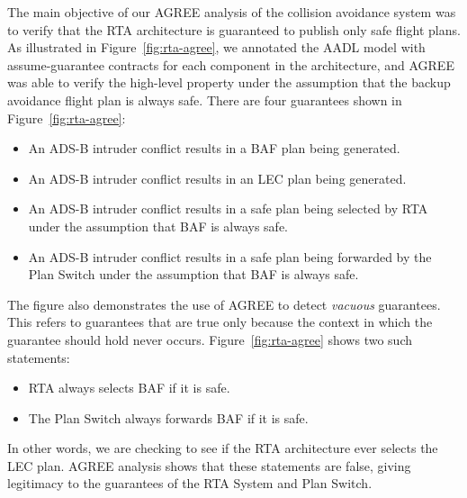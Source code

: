 
The main objective of our AGREE analysis of the collision avoidance system was to verify that the RTA architecture is guaranteed to publish only safe flight plans.
%
As illustrated in Figure~\ref{fig:rta-agree}, we annotated the AADL model with assume-guarantee contracts for each component in the architecture, and AGREE was able to verify the high-level property under the assumption that the backup avoidance flight plan is always safe.
There are four guarantees shown in Figure~\ref{fig:rta-agree}:
\begin{itemize}
\item An ADS-B intruder conflict results in a BAF plan being generated.
\item An ADS-B intruder conflict results in an LEC plan being generated.
\item An ADS-B intruder conflict results in a safe plan being selected by RTA under the assumption that BAF is always safe.
\item An ADS-B intruder conflict results in a safe plan being forwarded by the Plan Switch under the assumption that BAF is always safe.
\end{itemize}

The figure also demonstrates the use of AGREE to detect {\em vacuous} guarantees.  This refers to guarantees that are true only because the context in which the guarantee should hold never occurs. Figure~\ref{fig:rta-agree} shows two such statements:
\begin{itemize}
\item RTA always selects BAF if it is safe.
\item The Plan Switch always forwards BAF if it is safe.
\end{itemize}
In other words, we are checking to see if the RTA architecture ever selects the LEC plan.  AGREE analysis shows that these statements are false, giving legitimacy to the guarantees of the RTA System and Plan Switch.


